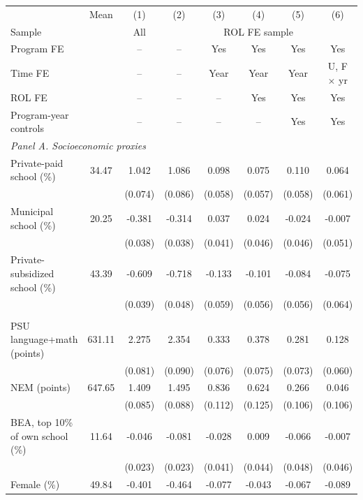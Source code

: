 \begin{tabular}{lc*{6}{c}}
\toprule
 & Mean & (1) & (2) & (3) & (4) & (5) & (6) \\
Sample & & All & \multicolumn{5}{c}{ROL FE sample} \\
Program FE & & -- & -- & Yes & Yes & Yes & Yes \\
Time FE & & -- & -- & Year & Year & Year & U, F \(\times\) yr \\
ROL FE & & -- & -- & -- & Yes & Yes & Yes \\
Program-year controls & & -- & -- & -- & -- & Yes & Yes \\
\midrule
\multicolumn{8}{l}{\textit{Panel A. Socioeconomic proxies}} \\
Private-paid school (\%) &  34.47 &  1.042\sym{***} &  1.086\sym{***} &  0.098\sym{*} &  0.075 &  0.110\sym{*} &  0.064 \\
 &  & (0.074) & (0.086) & (0.058) & (0.057) & (0.058) & (0.061) \\
Municipal school (\%) &  20.25 & -0.381\sym{***} & -0.314\sym{***} &  0.037 &  0.024 & -0.024 & -0.007 \\
 &  & (0.038) & (0.038) & (0.041) & (0.046) & (0.046) & (0.051) \\
Private-subsidized school (\%) &  43.39 & -0.609\sym{***} & -0.718\sym{***} & -0.133\sym{**} & -0.101\sym{*} & -0.084 & -0.075 \\
 &  & (0.039) & (0.048) & (0.059) & (0.056) & (0.056) & (0.064) \\
\addlinespace
\multicolumn{8}{l}{\textit{Panel B. Achievement and other predetermined}} \\
PSU language+math (points) & 631.11 &  2.275\sym{***} &  2.354\sym{***} &  0.333\sym{***} &  0.378\sym{***} &  0.281\sym{***} &  0.128\sym{**} \\
 &  & (0.081) & (0.090) & (0.076) & (0.075) & (0.073) & (0.060) \\
NEM (points) & 647.65 &  1.409\sym{***} &  1.495\sym{***} &  0.836\sym{***} &  0.624\sym{***} &  0.266\sym{**} &  0.046 \\
 &  & (0.085) & (0.088) & (0.112) & (0.125) & (0.106) & (0.106) \\
BEA, top 10\% of own school (\%) &  11.64 & -0.046\sym{**} & -0.081\sym{***} & -0.028 &  0.009 & -0.066 & -0.007 \\
 &  & (0.023) & (0.023) & (0.041) & (0.044) & (0.048) & (0.046) \\
Female (\%) &  49.84 & -0.401\sym{***} & -0.464\sym{***} & -0.077 & -0.043 & -0.067 & -0.089 \\

\end{tabular}
